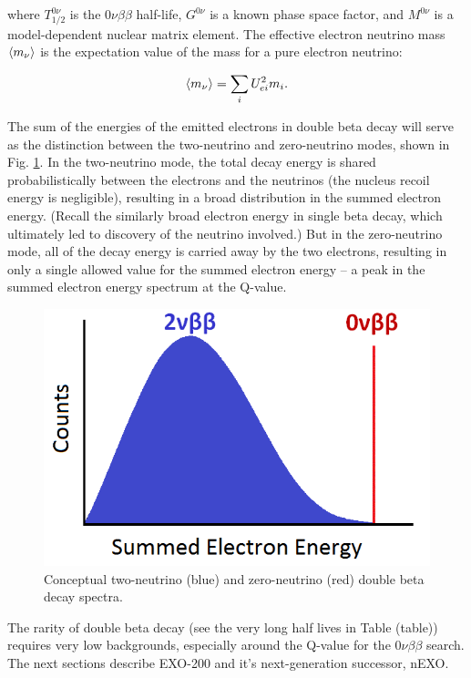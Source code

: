 \noindent
where $T_{1/2}^{0\nu}$ is the $0\nu\beta\beta$ half-life,  $G^{0\nu}$ is a known phase space factor, and $M^{0\nu}$ is a model-dependent nuclear matrix element. The effective electron neutrino mass $\braket{m_{\nu}}$ is the expectation value of the mass for a pure electron neutrino:

\begin{equation}
\braket{m_{\nu}} = \sum\limits_{i} U_{ei}^{2} m_{i}.
\label{eqn:effectivemass}
\end{equation}

The sum of the energies of the emitted electrons in double beta decay will serve as the distinction between the two-neutrino and zero-neutrino modes, shown in Fig. \ref{fig:spectrum_bb}. In the two-neutrino mode, the total decay energy is shared probabilistically between the electrons and the neutrinos (the nucleus recoil energy is negligible), resulting in a broad distribution in the summed electron energy. (Recall the similarly broad electron energy in single beta decay, which ultimately led to discovery of the neutrino involved.) But in the zero-neutrino mode, all of the decay energy is carried away by the two electrons, resulting in only a single allowed value for the summed electron energy -- a peak in the summed electron energy spectrum at the Q-value. 

\begin{figure}[H]
        \centering
                \includegraphics[width=.7\textwidth]{figures/spectrum_bb.png}
                \caption{Conceptual two-neutrino (blue) and zero-neutrino (red) double beta decay spectra.}
\label{fig:spectrum_bb}
\end{figure}

The rarity of double beta decay (see the very long half lives in Table (table)) requires very low backgrounds, especially around the Q-value for the $0\nu\beta\beta$ search. The next sections describe EXO-200 and it's next-generation successor, nEXO.

